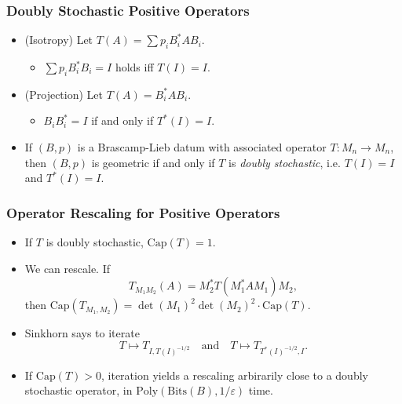 \documentclass[usenames,dvipsnames,12pt]{beamer}
\begin{document}
\begin{frame}
    \frametitle{Doubly Stochastic Positive Operators}

    \begin{itemize}
        \item (Isotropy) Let $T(A) = \sum p_i B_i^* A B_i$.
        \begin{itemize}
            \pause
            \item $\sum p_i B_i^* B_i = I$ holds iff $T(I) = I$.
        \end{itemize}

        \pause
        \item (Projection) Let $T(A) = B_i^* A B_i$.
        \begin{itemize}
            \pause
            \item $B_i B_i^* = I$ if and only if $T^*(I) = I$.
        \end{itemize}

        \pause
        \item If $(B,p)$ is a Brascamp-Lieb datum with associated operator $T: M_n \to M_n$, then $(B,p)$ is geometric if and only if $T$ is \emph{doubly stochastic}, i.e. $T(I) = I$ and $T^*(I) = I$.
    \end{itemize}
\end{frame}

\begin{frame}
    \frametitle{Operator Rescaling for Positive Operators}

    \begin{itemize}
        \item If $T$ is doubly stochastic, $\text{Cap}(T) = 1$.

        \pause
        \item We can rescale. If
        \[ T_{M_1M_2}(A) = M_2^* T(M_1^* A M_1) M_2, \]
        then $\text{Cap}(T_{M_1,M_2}) = \det(M_1)^2 \det(M_2)^2 \cdot \text{Cap}(T)$.

        \pause
        \item Sinkhorn says to iterate
        \[ T \mapsto T_{I,T(I)^{-1/2}} \quad\text{and}\quad T \mapsto T_{T^*(I)^{-1/2}, I}. \]

        \pause
        \item If $\text{Cap}(T) > 0$, iteration yields a rescaling arbirarily close to a doubly stochastic operator, in $\text{Poly}(\text{Bits}(B), 1/\varepsilon)$ time.
    \end{itemize}
\end{frame}
\end{document}
